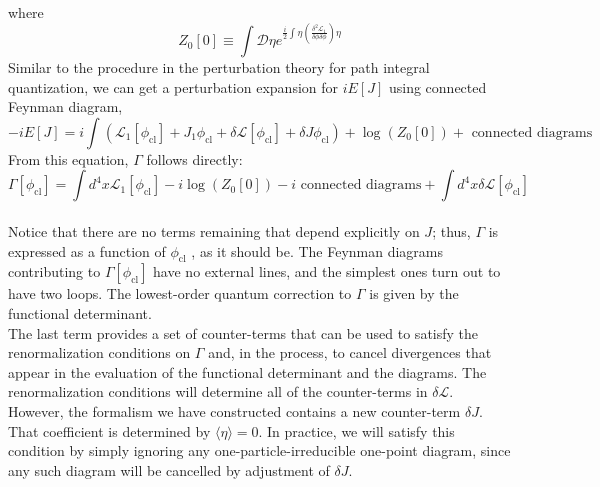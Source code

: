 where
\[Z_0[0] \equiv \int \mathcal{D}\eta e^{ \frac{i}{2}\int \eta \left( \frac{\delta^2 \mathcal{L}_1}{\delta \phi \delta \phi}\right) \eta }\]
Similar to the procedure in the perturbation theory for path integral quantization, we can get a perturbation expansion for $iE[J]$ using connected Feynman diagram,
\[-iE[J] = i \int ( \mathcal{L}_1 [\phi_{\mathrm{cl}}] + J_1\phi_{\mathrm{cl}} + \delta \mathcal{L}[\phi_{\mathrm{cl}}] + \delta J \phi_{\mathrm{cl}} ) + \log(Z_0[0]) + \mbox{ connected diagrams }\]
From this equation, $\Gamma$ follows directly:
\[\Gamma[\phi_{\mathrm{cl}}] = \int d^4x \mathcal{L}_1[\phi_{\mathrm{cl}}] -i\log(Z_0[0]) -i \mbox{ connected diagrams} + \int d^4x \delta\mathcal{L}[\phi_{\mathrm{cl}}]\]
\\
Notice that there are no terms remaining that depend explicitly on $J$; thus, $\Gamma$ is expressed as a function of $\phi_{\mathrm{cl}}$ , as it should be. The Feynman diagrams contributing to $\Gamma[\phi_{\mathrm{cl}}]$ have no external lines, and the simplest ones turn out to have two loops. The lowest-order quantum correction to $\Gamma$ is given by the
functional determinant.
\\
The last term provides a set of counter-terms that can be used
to satisfy the renormalization conditions on $\Gamma$ and, in the process, to cancel divergences that appear in the evaluation of the functional determinant and the diagrams. The renormalization conditions will determine all of the counter-terms in $\delta \mathcal{L}$. However, the formalism we have constructed contains a new counter-term $\delta J$. That coefficient is determined by  $\langle \eta \rangle = 0$. In practice, we will satisfy this condition by simply ignoring any one-particle-irreducible one-point diagram, since any such diagram will be cancelled by adjustment of $\delta J$.

